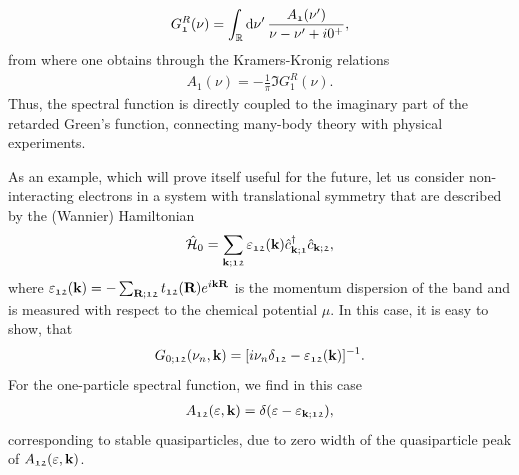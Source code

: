 \documentclass[../../main.tex]{subfiles}
\begin{document}
\begin{align}
	G_{\mathfrak{1}}^{R}(\nu)=\int_{\mathbb{R}}^{}\text{d}\nu'\,\frac{A_{\mathfrak{1}}(\nu')}{\nu-\nu'+i 0^{+}},
\end{align}
from where one obtains through the Kramers-Kronig relations
\begin{align}
	A_{\mathfrak{1}}(\nu) = -\frac1\pi \Im G_{\mathfrak{1}}^{R}(\nu).
\end{align}
Thus, the spectral function is directly coupled to the imaginary part of the retarded Green's function, connecting many-body theory with physical experiments.

As an example, which will prove itself useful for the future, let us consider non-interacting electrons in a system with translational symmetry that are described by the (Wannier) Hamiltonian
\begin{align}
	\hat{\mathcal{H}}_0=\sum_{\textbf{k};\mathfrak{12}}\varepsilon_{\mathfrak{12}}(\textbf{k})\hat c^{\dagger}_{\textbf{k};\mathfrak{1}}\hat c_{\textbf{k};\mathfrak{2}},
\end{align}
where $\varepsilon_{\mathfrak{12}}(\textbf{k})=-\sum_{\textbf{R};\mathfrak{12}} t_{\mathfrak{12}}(\textbf{R})e^{i\textbf{kR}}$ is the momentum dispersion of the band and is measured with respect to the chemical potential $\mu$. In this case, it is easy to show, that 
\begin{align}\label{eq:non_interacting_one_p_green}
	G_{0;\mathfrak{12}}(\nu_n, \textbf{k})=[i\nu_n\delta_{\mathfrak{12}}-\varepsilon_{\mathfrak{12}}(\textbf{k})]^{-1}.
\end{align}
For the one-particle spectral function, we find in this case 
\begin{align}
	A_{\mathfrak{12}}(\varepsilon,\textbf{k})=\delta(\varepsilon-\varepsilon_{\textbf{k};\mathfrak{12}}),
\end{align}
corresponding to stable quasiparticles, due to zero width of the quasiparticle peak of $A_{\mathfrak{12}}(\varepsilon,\textbf{k})$.
\end{document}
